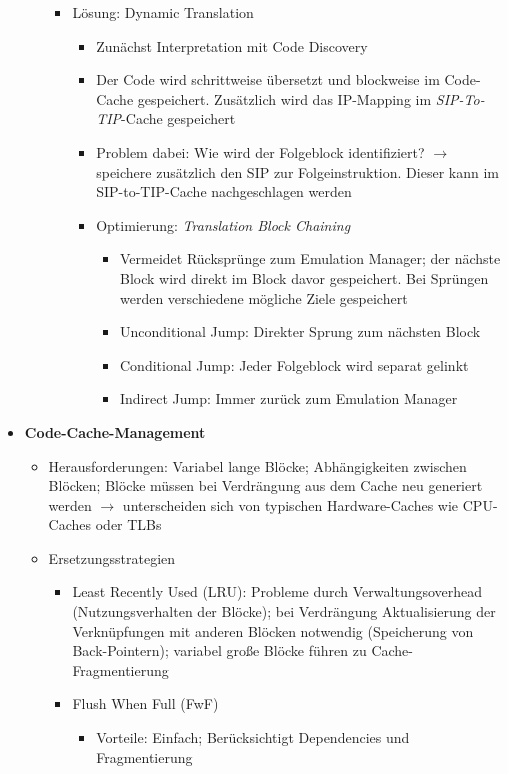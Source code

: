 \begin{itemize}
\begin{itemize}
\begin{itemize}
			\item Lösung: Dynamic Translation
			\begin{itemize}
				\item Zunächst Interpretation mit Code Discovery
				\item Der Code wird schrittweise übersetzt und blockweise im Code-Cache gespeichert. Zusätzlich wird das IP-Mapping im \textit{SIP-To-TIP}-Cache gespeichert
				\item Problem dabei: Wie wird der Folgeblock identifiziert? \(\rightarrow\) speichere zusätzlich den SIP zur Folgeinstruktion. Dieser kann im SIP-to-TIP-Cache nachgeschlagen werden
				\item Optimierung: \textit{Translation Block Chaining}
				\begin{itemize}
					\item Vermeidet Rücksprünge zum Emulation Manager; der nächste Block wird direkt im Block davor gespeichert. Bei Sprüngen werden verschiedene mögliche Ziele gespeichert
					\item Unconditional Jump: Direkter Sprung zum nächsten Block
					\item Conditional Jump: Jeder Folgeblock wird separat gelinkt
					\item Indirect Jump: Immer zurück zum Emulation Manager
				\end{itemize}
			\end{itemize}
		\end{itemize}
	\end{itemize}
	\item \textbf{Code-Cache-Management}
	\begin{itemize}
		\item Herausforderungen: Variabel lange Blöcke; Abhängigkeiten zwischen Blöcken; Blöcke müssen bei Verdrängung aus dem Cache neu generiert werden \(\rightarrow\) unterscheiden sich von typischen Hardware-Caches wie CPU-Caches oder TLBs
		\item Ersetzungsstrategien
		\begin{itemize}
			\item Least Recently Used (LRU): Probleme durch Verwaltungsoverhead (Nutzungsverhalten der Blöcke); bei Verdrängung Aktualisierung der Verknüpfungen mit anderen Blöcken notwendig (Speicherung von Back-Pointern); variabel große Blöcke führen zu Cache-Fragmentierung
			\item Flush When Full (FwF)
			\begin{itemize}
				\item Vorteile: Einfach; Berücksichtigt Dependencies und Fragmentierung

\end{itemize}
\end{itemize}
\end{itemize}
\end{itemize}

